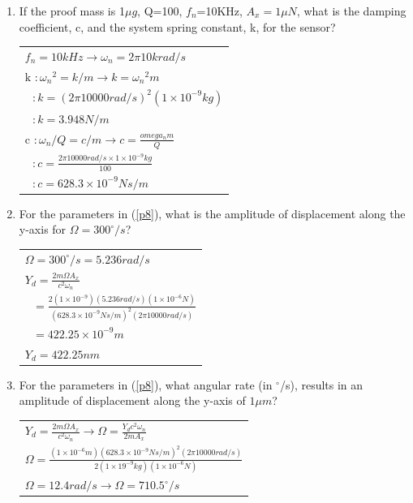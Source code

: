 \documentclass{article}
\begin{document}
\begin{multicols}{2}
\begin{enumerate}
\item\label{p8}
If the proof mass is 1$\mu g$, Q=100, $f_n$=10KHz, $A_x=1\mu N$, 
what is the damping coefficient, c, and the system spring 
constant, k, for the sensor?

\begin{tabular}{ l }
	$f_n = 10kHz \rightarrow \omega_n = 2 \pi 10 k rad/s$\\
	$\text{k }\colon {\omega_n}^2 = k / m \rightarrow k = {\omega_n}^2 m$\\
	$\text{  }\colon k = (2 \pi 10000 rad/s)^2 (1\times 10^{-9} kg)$\\
	$\text{  }\colon k = 3.948 N/m$\\
	$\text{c }\colon \omega_n / Q = c / m \rightarrow c = \frac{omega_n m}{Q}$\\
	$\text{  }\colon c = \frac{2 \pi 10000 rad/s \times 1\times10^{-9} kg}{100}$\\
	$\text{  }\colon c = 628.3 \times 10^{-9} N s /m$
\end{tabular}

\item\label{p9}
For the parameters in (\ref{p8}), what is the amplitude of 
displacement along the y-axis for $\Omega = 300^{\circ}/s$?

\begin{tabular}{ l }
	$\Omega = 300^{\circ}/s = 5.236 rad/s$\\
	$Y_d = \frac{2 m \Omega A_x}{c^2 \omega_n}$\\
	$\text{  }= \frac{2 (1\times10^{-9}) (5.236 rad/s) (1\times 10^{-6} N)}
		{(628.3\times 10^{-9} N s /m)^2 (2 \pi 10000 rad/s)}$\\
	$\text{  }= 422.25 \times 10^{-9} m$\\
	$Y_d = 422.25 nm$
\end{tabular}

\item\label{p10}
For the parameters in (\ref{p8}), what angular rate (in 
$^{\circ}$/s), results in an amplitude of displacement along the
y-axis of $1\mu m$?

\begin{tabular}{ l }
	$Y_d = \frac{2 m \Omega A_x}{c^2 \omega_n} \rightarrow
		\Omega = \frac{Y_d c^2 \omega_n}{2 m A_x}$\\
	$\Omega = \frac{(1\times10^{-6}m)(628.3 \times 10^{-9}N s/m)^2(2\pi 10000 rad/s)}
		{2 (1\times19^{-9} kg)(1\times10^{-6}N)}$\\
	$\Omega = 12.4 rad/s \rightarrow \Omega = 710.5^{\circ}/s$
\end{tabular}

\end{enumerate}
\end{multicols}
\end{document}
